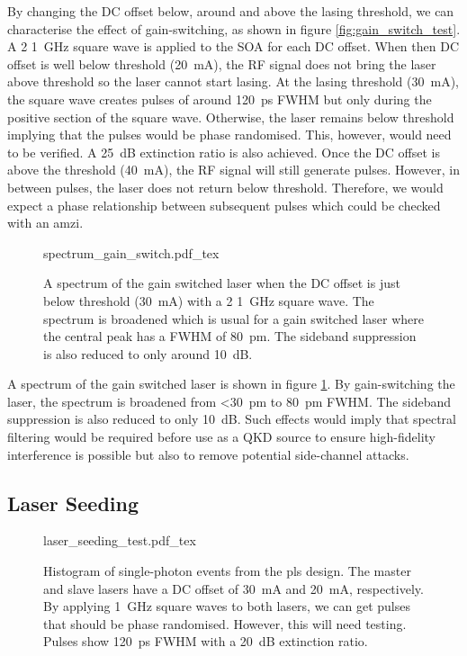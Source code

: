 By changing the DC offset below, around and above the lasing threshold, we can characterise the effect of gain-switching, as shown in figure \ref{fig:gain_switch_test}. A \SI{2}{\Vpp} \SI{1}{GHz} square wave is applied to the SOA for each DC offset. When then DC offset is well below threshold (\SI{20}{\mA}), the RF signal does not bring the laser above threshold so the laser cannot start lasing. At the lasing threshold (\SI{30}{\mA}), the square wave creates pulses of around \SI{120}{ps} \ac{FWHM} but only during the positive section of the square wave. Otherwise, the laser remains below threshold implying that the pulses would be phase randomised. This, however, would need to be verified. A \SI{25}{dB} extinction ratio is also achieved. Once the DC offset is above the threshold (\SI{40}{\mA}), the RF signal will still generate pulses. However, in between pulses, the laser does not return below threshold. Therefore, we would expect a phase relationship between subsequent pulses which could be checked with an \ac{amzi}.

\begin{figure}[tp]
	\centering
	\small	
	\def\svgwidth{0.9\textwidth} 
	{spectrum_gain_switch.pdf_tex}
	\caption[Spectrum of the gain switched laser]{A spectrum of the gain switched laser when the DC offset is just below threshold (\SI{30}{mA}) with a \SI{2}{\Vpp} \SI{1}{\GHz} square wave. The spectrum is broadened which is usual for a gain switched laser where the central peak has a \acs{FWHM} of \SI{80}{pm}. The sideband suppression is also reduced to only around \SI{10}{dB}.}
	\label{fig:gain_switch_spectrum}
\end{figure}

A spectrum of the gain switched laser is shown in figure \ref{fig:gain_switch_spectrum}. By gain-switching the laser, the spectrum is broadened from \SI{<30}{pm} to \SI{80}{pm} \ac{FWHM}. The sideband suppression is also reduced to only \SI{10}{dB}. Such effects would imply that spectral filtering would be required before use as a \ac{QKD} source to ensure high-fidelity interference is possible but also to remove potential side-channel attacks.

\subsection{Laser Seeding}

\begin{figure}[tp]
	\centering	
	\def\svgwidth{0.9\textwidth} 
	{laser_seeding_test.pdf_tex}
	\caption[Integrated laser seeding test histogram]{Histogram of single-photon events from the \acs{pls} design. The master and slave lasers have a DC offset of \SI{30}{\mA} and \SI{20}{\mA}, respectively. By applying \SI{1}{GHz} square waves to both lasers, we can get pulses that should be phase randomised. However,  this will need testing. Pulses show \SI{120}{ps} \acs{FWHM} with a \SI{20}{dB} extinction ratio.}
	\label{fig:las_seed_test}
\end{figure}

